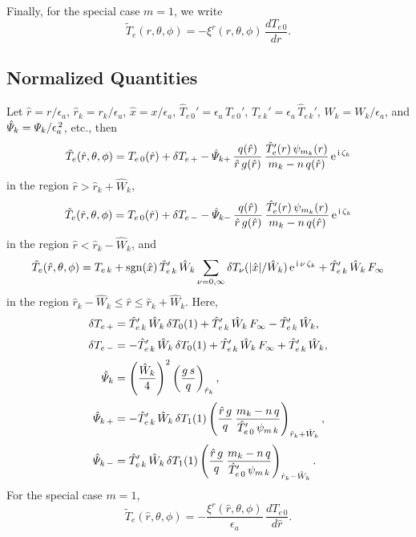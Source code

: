 \documentclass[12pt,prb,aps,notitlepage]{revtex4-1}
\begin{document}
Finally, for the special case $m=1$, we write
\begin{equation}
\tilde{T}_e(r,\theta,\phi) = - \xi^r(r,\theta,\phi)\,\frac{dT_{e\,0}}{dr}.
\end{equation}

\subsection{Normalized Quantities}
Let $\hat{r}=r/\epsilon_a$, $\hat{r}_k=r_k/\epsilon_a$, $\hat{x}= x/\epsilon_a$, $\hat{T}_{e\,0}' = \epsilon_a\,T_{e\,0}'$, $\hat{T}_{e\,k}'=\epsilon_a\,\hat{T}_{e\,k}'$, 
$\hat{W}_k = W_k/\epsilon_a$, and $\hat{\mit\Psi}_k={\mit\Psi}_k/\epsilon_a^{\,2}$, etc., 
then
\begin{equation}
\tilde{T}_e(\hat{r},\theta,\phi) = T_{e\,0}(\hat{r}) + \delta T_{e\,+} - \hat{\mit\Psi}_{k+}\,\frac{q(\hat{r})}{\hat{r}\,g(\hat{r})}\,\frac{\hat{T}_e'(r)\,\psi_{m_k}(r)}{m_k-n\,q(\hat{r})}\,{\rm e}^{\,{\rm i}\,\zeta_k}
\end{equation}
in the region $\hat{r}>\hat{r}_k+\hat{W}_k$, 
\begin{equation}
\tilde{T}_e(\hat{r},\theta,\phi) = T_{e\,0}(\hat{r}) + \delta T_{e\,-} - \hat{{\mit\Psi}}_{k-}\,\frac{q(\hat{r})}{\hat{r}\,g(\hat{r})}\,\frac{\hat{T}_e'(r)\,\psi_{m_k}(r)}{m_k-n\,q(\hat{r})}\,{\rm e}^{\,{\rm i}\,\zeta_k}
\end{equation}
in the region $\hat{r}< \hat{r}_k-\hat{W}_k$, and 
\begin{equation}
\tilde{T}_e(\hat{r}, \theta,\phi)=T_{e\,k} +{\rm sgn}(\hat{x})\,\hat{T}_{e\,k}'\,\hat{W}_k\sum_{\nu=0,\infty}\delta T_\nu(|\hat{x}|/\hat{W}_k)\,{\rm e}^{\,{\rm i}\,\nu\,\zeta_k}+\hat{T}_{e\,k}'\,\hat{W}_k\,F_\infty
\end{equation}
in the region $\hat{r}_k-\hat{W}_k \leq \hat{r}\leq \hat{r}_k+\hat{W}_k$. Here, 
\begin{align}
\delta T_{e\,+} &= \hat{T}_{e\,k}'\,\hat{W}_k\,\delta T_0(1)+\hat{T}_{e\,k}'\,\hat{W}_k\,F_\infty - \hat{T}_{e\,k}'\,\hat{W}_k,\\[0.5ex]
\delta T_{e\,-} &=- \hat{T}_{e\,k}'\,\hat{W}_k\,\delta T_0(1) +\hat{T}_{e\,k}'\,\hat{W}_k\,F_\infty +\hat{T}_{e\,k}'\,\hat{W}_k,\\[0.5ex]
\hat{\mit\Psi}_k&=\left(\frac{\hat{W}_k}{4}\right)^2\left(\frac{g\,s}{q}\right)_{\hat{r}_k},\\[0.5ex]
\hat{\mit\Psi}_{k\,+} &= - \hat{T}_{e\,k}'\,\hat{W}_k\,\delta T_1(1)\left(\frac{\hat{r}\,g}{q}\,\frac{m_k-n\,q}{\hat{T}_{e\,0}'\,\psi_{m\,k}}\right)_{\hat{r}_k+\hat{W}_k},\\[0.5ex]
\hat{\mit\Psi}_{k\,-} &= \hat{T}_{e\,k}'\,\hat{W}_k\,\delta T_1(1)\left(\frac{\hat{r}\,g}{q}\,\frac{m_k-n\,q}{\hat{T}_{e\,0}'\,\psi_{m\,k}}\right)_{\hat{r}_k-\hat{W}_k}.
\end{align}
For the special case $m=1$, 
\begin{equation}
\tilde{T}_e(\hat{r},\theta,\phi) = - \frac{\xi^r(\hat{r},\theta,\phi)}{\epsilon_a}\,\frac{ dT_{e\,0}}{d\hat{r}}.
\end{equation}
\end{document}
